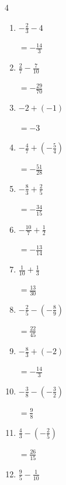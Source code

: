 \begin{multicols}{4}
\begin{enumerate}
        $\displaystyle =-\frac{15}{8}$

  \item $\displaystyle -\frac{2}{3} - 4$

        $\displaystyle =-\frac{14}{3}$

  \item $\displaystyle \frac{2}{7} - \frac{7}{10}$

        $\displaystyle =-\frac{29}{70}$

  \item $\displaystyle -2 + \left(-1\right)$

        $\displaystyle =-3$

  \item $\displaystyle -\frac{4}{7} + \left(-\frac{5}{4}\right)$

        $\displaystyle =-\frac{51}{28}$

  \item $\displaystyle -\frac{8}{3} + \frac{2}{5}$

        $\displaystyle =-\frac{34}{15}$

  \item $\displaystyle -\frac{10}{7} + \frac{1}{2}$

        $\displaystyle =-\frac{13}{14}$

  \item $\displaystyle \frac{1}{10} + \frac{1}{3}$

        $\displaystyle =\frac{13}{30}$

  \item $\displaystyle -\frac{2}{5} - \left(-\frac{8}{9}\right)$

        $\displaystyle =\frac{22}{45}$

  \item $\displaystyle -\frac{8}{3} + \left(-2\right)$

        $\displaystyle =-\frac{14}{3}$

\columnbreak %

\resetques

  \item $\displaystyle -\frac{3}{8} - \left(-\frac{3}{2}\right)$

        $\displaystyle =\frac{9}{8}$

  \item $\displaystyle \frac{4}{3} - \left(-\frac{2}{5}\right)$

        $\displaystyle =\frac{26}{15}$

  \item $\displaystyle \frac{9}{5} - \frac{1}{10}$


\end{enumerate}
\end{multicols}
